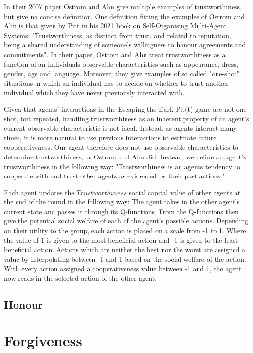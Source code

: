 In their 2007 paper Ostrom and Ahn give multiple examples of trustworthiness, but give no concise definition. One definition fitting the examples of Ostrom and Ahn is that given by Pitt in his 2021 book on Self-Organising Multi-Agent Systems: "Trustworthiness, as distinct from trust, and related to reputation, being a shared understanding of someone’s willingness to honour agreements and commitments"\cite{pitt}. In their paper, Ostrom and Ahn treat trustworthiness as a function of an individuals observable characteristics such as appearance, dress, gender, age and language. Moreover, they give examples of so called "one-shot" situations in which an individual has to decide on whether to trust another individual which they have never previously interacted with.\cite{ostrom-ahn}

Given that agents' interactions in the Escaping the Dark Pit(t) game are not one-shot, but repeated, handling trustworthiness as an inherent property of an agent's current observable characteristic is not ideal. Instead, as agents interact many times, it is more natural to use previous interactions to estimate future cooperativeness. Our agent therefore does not use observable characteristics to determine trustworthiness, as Ostrom and Ahn did. Instead, we define an agent's trustworthiness in the following way: "Trustworthiness is an agents tendency to cooperate with and trust other agents as evidenced by their past actions."

Each agent updates the $Trustworthiness$ social capital value of other agents at the end of the round in the following way: The agent takes in the other agent's current state and passes it through its Q-functions. From the Q-functions then give the potential social welfare of each of the agent's possible actions. Depending on their utility to the group, each action is placed on a scale from -1 to 1. Where the value of 1 is given to the most beneficial action and -1 is given to the least beneficial action. Actions which are neither the best nor the worst are assigned a value by interpolating between -1 and 1 based on the social welfare of the action. With every action assigned a cooperativeness value between -1 and 1, the agent now reads in the selected action of the other agent. 

\subsection{Honour}
\label{subsection:honour}

\section{Forgiveness}

